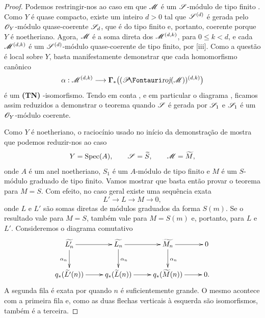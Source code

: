 \begin{proof}
Podemos restringir-nos ao caso em que $\mathscr{M}$ é um $\mathscr{S}$-módulo de tipo finito .
Como $Y$ é quase compacto, existe um inteiro $d>0$ tal que $\mathscr{S}^{(d)}$ é gerada pelo $\mathscr{O}_Y$-módulo quase-coerente $\mathscr{S}_d$, que é do tipo finito  e, portanto, coerente porque $Y$ é noetheriano.
Agora, $\mathscr{M}$ é a soma direta dos $\mathscr{M}^{(d,k)}$, para $0\leq k<d$, e cada $\mathscr{M}^{(d,k)}$ é um $\mathscr{S}^{(d)}$-módulo quase-coerente de tipo finito, por [iii].
Como a questão é local sobre $Y$, basta manifestamente demonstrar que cada homomorfismo canônico
\[
  \alpha:\sh{M}^{(d,k)}
  \longrightarrow
  \bbGamma_*\bigl((\shProj(\sh{M}))^{(d,k)}\bigr)
\]
é um \textbf{(TN) }-isomorfismo.
Tendo em conta , e em particular o diagrama , ficamos assim reduzidos a demonstrar o teorema quando $\mathscr{S}$ é gerada por $\mathscr{S}_1$ e $\mathscr{S}_1$ é um $\mathscr{O}_Y$-módulo coerente.

Como $Y$ é noetheriano, o raciocínio usado no início da demonstração de  mostra que podemos reduzir-nos ao caso
\[
  Y=\operatorname{Spec}(A),\qquad
  \mathscr{S}=\widetilde{S},\qquad
  \mathscr{M}=\widetilde{M},
\]
onde $A$ é um anel noetheriano, $S_1$ é um $A$-módulo de tipo finito e $M$ é um $S$-módulo graduado de tipo finito.
Vamos mostrar que basta então provar o teorema para $M=S$.
Com efeito, no caso geral existe uma sequência exata
\[
  L'\longrightarrow L\longrightarrow M\longrightarrow0,
\]
onde $L$ e $L'$ são somas diretas de módulos graduados da forma $S(m)$.
Se o resultado vale para $M=S$, também vale para $M=S(m)$ e, portanto, para $L$ e $L'$.
Consideremos o diagrama comutativo
\[
  \xymatrix{
    \widetilde{L'_n}\ar[r]\ar[d]_{\alpha_n} &
    \widetilde{L_n}\ar[r]\ar[d]^{\alpha_n} &
    \widetilde{M_n}\ar[r]\ar[d]^{\alpha_n} &
    0\\
    q_*(\widetilde{L'}(n))\ar[r] &
    q_*(\widetilde{L}(n))\ar[r] &
    q_*(\widetilde{M}(n))\ar[r] &
    0 .
  }
\]
A segunda fila é exata por  quando $n$ é suficientemente grande.
O mesmo acontece com a primeira fila e, como as duas flechas verticais à esquerda são isomorfismos, também é a terceira.


\end{proof}
